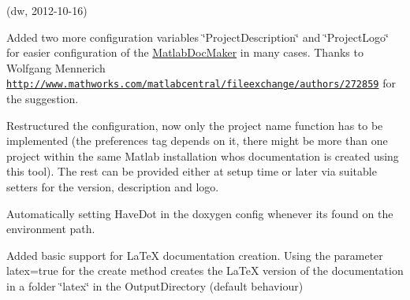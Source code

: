 
\begin{DoxyRefList}
\item[\label{newfeat1_4__newfeat1_4000001}%
\Hypertarget{newfeat1_4__newfeat1_4000001}%
Class \hyperlink{class_matlab_doc_maker}{Matlab\+Doc\+Maker} ](dw, 2012-\/10-\/16)
\begin{DoxyItemize}
\item Added two more configuration variables \char`\"{}\+Project\+Description\char`\"{} and \char`\"{}\+Project\+Logo\char`\"{} for easier configuration of the \hyperlink{class_matlab_doc_maker}{Matlab\+Doc\+Maker} in many cases. Thanks to Wolfgang Mennerich \href{http://www.mathworks.com/matlabcentral/fileexchange/authors/272859}{\tt http\+://www.\+mathworks.\+com/matlabcentral/fileexchange/authors/272859} for the suggestion.
\item Restructured the configuration, now only the project name function has to be implemented (the preferences tag depends on it, there might be more than one project within the same Matlab installation whos documentation is created using this tool). The rest can be provided either at setup time or later via suitable setters for the version, description and logo.
\item Automatically setting Have\+Dot in the doxygen config whenever its found on the environment path.
\item Added basic support for La\+TeX documentation creation. Using the parameter {\ttfamily latex}=true for the create method creates the La\+TeX version of the documentation in a folder \char`\"{}latex\char`\"{} in the Output\+Directory (default behaviour)
\end{DoxyItemize}
\end{DoxyRefList}